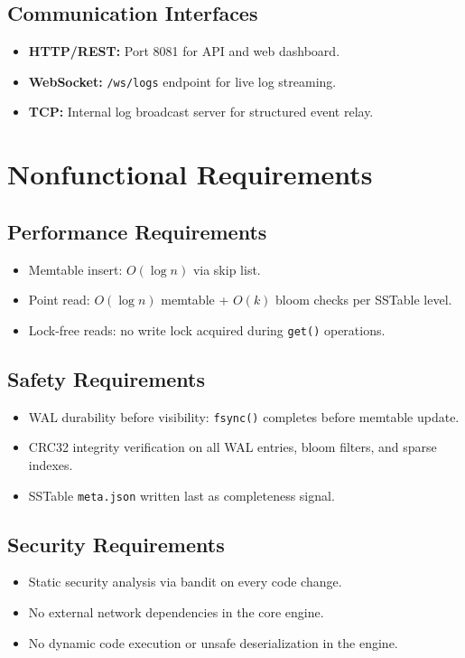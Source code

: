 \documentclass[oneside,a4paper,12pt]{book}
\begin{document}
\subsection{Communication Interfaces}
\begin{itemize}[leftmargin=2em]
    \item \textbf{HTTP/REST:} Port 8081 for API and web dashboard.
    \item \textbf{WebSocket:} \texttt{/ws/logs} endpoint for live log streaming.
    \item \textbf{TCP:} Internal log broadcast server for structured event relay.
\end{itemize}

\section{Nonfunctional Requirements}

\subsection{Performance Requirements}
\begin{itemize}[leftmargin=2em]
    \item Memtable insert: $O(\log n)$ via skip list.
    \item Point read: $O(\log n)$ memtable + $O(k)$ bloom checks per SSTable level.
    \item Lock-free reads: no write lock acquired during \texttt{get()} operations.
\end{itemize}

\subsection{Safety Requirements}
\begin{itemize}[leftmargin=2em]
    \item WAL durability before visibility: \texttt{fsync()} completes before memtable update.
    \item CRC32 integrity verification on all WAL entries, bloom filters, and sparse indexes.
    \item SSTable \texttt{meta.json} written last as completeness signal.
\end{itemize}

\subsection{Security Requirements}
\begin{itemize}[leftmargin=2em]
    \item Static security analysis via bandit on every code change.
    \item No external network dependencies in the core engine.
    \item No dynamic code execution or unsafe deserialization in the engine.
\end{itemize}
\end{document}
